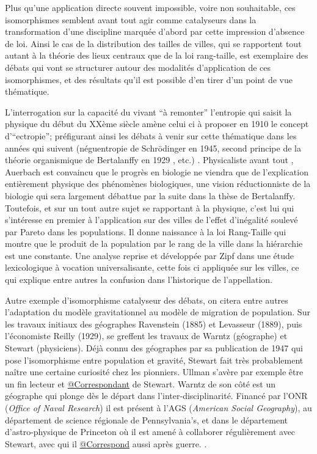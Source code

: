 Plus qu'une application directe souvent impossible, voire non souhaitable, ces isomorphismes semblent avant tout agir comme catalyseurs dans la transformation d'une discipline marquée d'abord par cette impression d'absence de loi. Ainsi le cas de la distribution des tailles de villes, qui se rapportent tout autant à la théorie des lieux centraux que de la loi rang-taille, est exemplaire des débats qui vont se structurer autour des modalités d'application de ces isomorphismes, et des résultats qu'il est possible d'en tirer d'un point de vue thématique.

L'interrogation sur la capacité du vivant \enquote{à remonter} l'entropie qui saisit la physique du début du XXème siècle amène celui ci à proposer en 1910 le concept d'\enquote{ectropie}; préfigurant ainsi les débats à venir sur cette thématique dans les années qui suivent (néguentropie de Schrödinger en 1945, second principe de la théorie organismique de Bertalanffy en 1929 \autocite[475]{Pouvreau2013}, etc.) \autocite[80]{Pouvreau2013}. Physicaliste avant tout \autocite[87]{Pouvreau2013}, Auerbach est convaincu que le progrès en biologie ne viendra que de l'explication entièrement physique des phénomènes biologiques, une vision réductionniste de la biologie qui sera largement débattue par la suite dans la thèse de Bertalanffy. Toutefois, et sur un tout autre sujet se rapportant à la physique, c'est lui qui s’intéresse en premier à l'application sur des villes de l'effet d'inégalité soulevé par Pareto dans les populations.\autocite{Auerbach1913} Il donne naissance à la loi Rang-Taille qui montre que le produit de la population par le rang de la ville dans la hiérarchie est une constante. Une analyse reprise et développée par Zipf dans une étude lexicologique à vocation universalisante, cette fois ci appliquée sur les villes, ce qui explique entre autres la confusion dans l’historique de l’appellation.

Autre exemple d'isomorphisme catalyseur des débats, on citera entre autres l'adaptation du modèle gravitationnel au modèle de migration de population. Sur les travaux initiaux des géographes Ravenstein (1885) et Levasseur (1889), puis l'économiste Reilly (1929), se greffent les travaux de Warntz (géographe) et Stewart (physiciens). Déjà connu des géographes par sa publication de 1947 qui pose l'isomorphisme entre population et gravité, Stewart fait très probablement naître une certaine curiosité chez les pionniers. Ullman s'avère par exemple être un fin lecteur \autocite[61]{Glick1988} et \href{http://nwda.orbiscascade.org/ark:/80444/xv01385}{@Correspondant} de Stewart. Warntz de son côté est un géographe qui plonge dès le départ dans l'inter-disciplinarité. Financé par l'ONR (\textit{Office of Naval Research}) il est présent à l'AGS (\textit{American Social Geography}), au département de science régionale de Pennsylvania's, et dans le département d'astro-physique de Princeton où il est amené à collaborer régulièrement avec Stewart, avec qui il \href{http://rmc.library.cornell.edu/EAD/htmldocs/RMM04392.html}{@Correspond} aussi après guerre. \autocite{Barnes2006a}.

